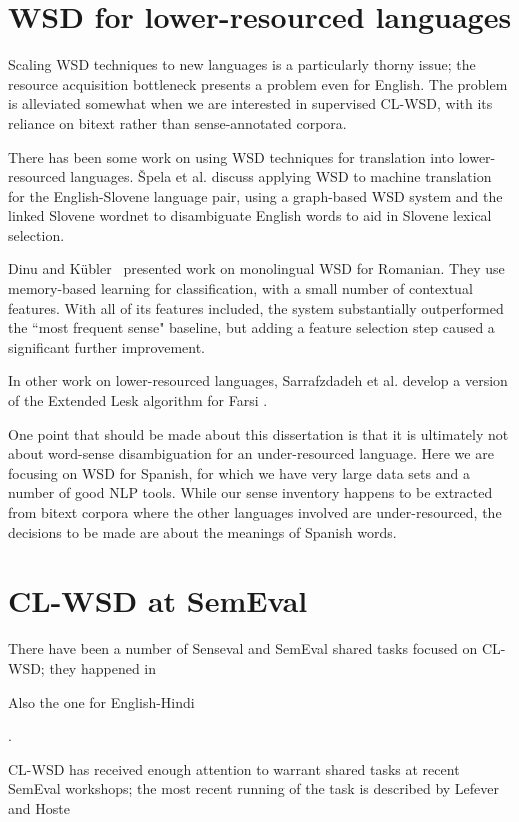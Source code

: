 \section{WSD for lower-resourced languages}
Scaling WSD techniques to new languages is a particularly thorny issue; the
resource acquisition bottleneck presents a problem even for English.
The problem is alleviated somewhat when we are interested in supervised CL-WSD,
with its reliance on bitext rather than sense-annotated corpora.

There has been some work on using WSD techniques for translation into
lower-resourced languages.  \v{S}pela et al.
\cite{vintar-fivser-vrvsvcaj:2012:ESIRMT-HyTra2012} discuss applying WSD to
machine translation for the English-Slovene language pair, using a graph-based
WSD system and the linked Slovene wordnet to disambiguate English words to aid
in Slovene lexical selection.

Dinu and Kübler~\cite{Dinu07} presented work on monolingual WSD for Romanian.
They use memory-based learning for classification, with a small number of
contextual features. With all of its features included, the system
substantially outperformed the ``most frequent sense" baseline, but adding a
feature selection step caused a significant further improvement.

In other work on lower-resourced languages, Sarrafzdadeh et al. develop
a version of the Extended Lesk algorithm for Farsi \cite{sarrafzdadeh}.

One point that should be made about this dissertation is that it is ultimately
not about word-sense disambiguation for an under-resourced language.  Here we
are focusing on WSD for Spanish, for which we have very large data sets and a
number of good NLP tools. While our sense inventory happens to be extracted
from bitext corpora where the other languages involved are under-resourced, the
decisions to be made are about the meanings of Spanish words.

\section{CL-WSD at SemEval}

There have been a number of Senseval and SemEval shared tasks focused on
CL-WSD; they happened in 

Also the one for English-Hindi
\cite{chklovski-EtAl:2004:Senseval-3}


\cite{task10}.

CL-WSD has received enough attention to warrant shared tasks at recent SemEval
workshops; the most recent running of the task is described by Lefever and
Hoste


